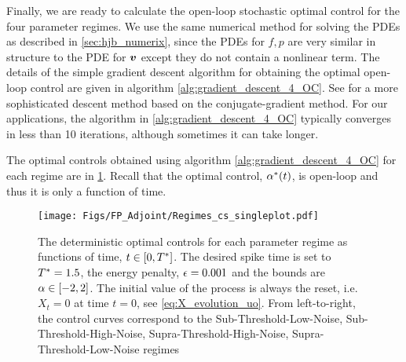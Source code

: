 Finally, we are ready to calculate the open-loop stochastic optimal control for
the four parameter regimes. We use the same numerical method for solving the
PDEs as described in \cref{sec:hjb_numerix}, since the PDEs for $f,p$ are very
similar in structure to the PDE for ${ \boldsymbol{v} }$ except they do not contain a nonlinear
term. The details of the simple gradient descent algorithm for obtaining the
optimal open-loop control are given in algorithm
\ref{alg:gradient_descent_4_OC}. See \cite{Annunziato2013} for a more
sophisticated descent method based on the conjugate-gradient method. For our
applications, the algorithm in \ref{alg:gradient_descent_4_OC} typically
converges in less than 10 iterations, although sometimes it can take longer. 

The optimal controls obtained using algorithm \ref{alg:gradient_descent_4_OC} for each regime are in
\cref{fig:FBK_Regimes_cs}. Recall that the optimal control, $\alpha^*(t)$, is open-loop and thus it is only a function of time.
\begin{figure}[htp]
\begin{center}
  \texttt{[image: Figs/FP\_Adjoint/Regimes\_cs\_singleplot.pdf]}
  \caption[labelInTOC]{The deterministic optimal controls for each parameter
  regime as functions of time, $t \in [0, { T^* }]$.
  The desired spike time is set to ${ T^* }=1.5$, the energy penalty, ${\epsilon}
  = 0.001$ and the bounds are $\alpha \in [-2,2]$.
  The initial value of the process is always the reset, i.e. $X_t=0$ at
time $t=0$, see \cref{eq:X_evolution_uo}.
  From left-to-right, the control curves correspond to the
  Sub-Threshold-Low-Noise, Sub-Threshold-High-Noise, Supra-Threshold-High-Noise,
  Supra-Threshold-Low-Noise regimes
  }
  \label{fig:FBK_Regimes_cs}
\end{center}  
\end{figure}   

